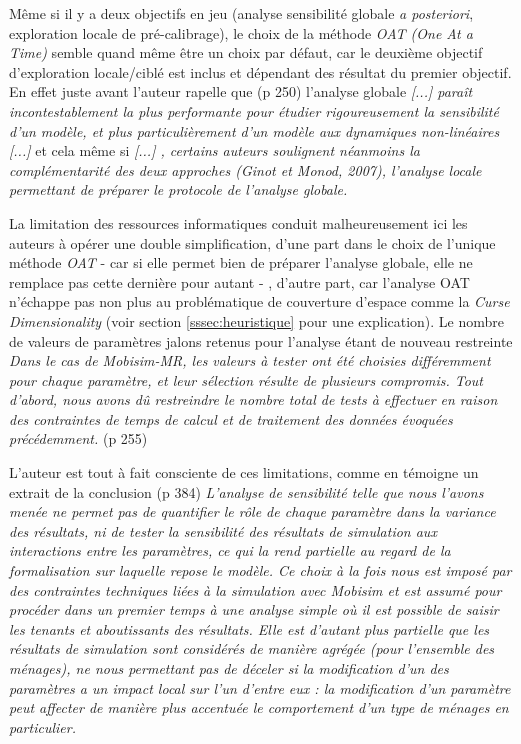 {Même si il y a deux objectifs en jeu (analyse sensibilité globale \textit{a posteriori}, exploration locale de pré-calibrage), le choix de la méthode \textit{OAT (One At a Time)} semble quand même être un choix par défaut, car le deuxième objectif d'exploration locale/ciblé est inclus et dépendant des résultat du premier objectif. En effet juste avant l'auteur rapelle que (p 250) l'analyse globale \textit{[...] paraît incontestablement la plus performante pour étudier rigoureusement la sensibilité d’un modèle, et plus particulièrement d’un modèle aux dynamiques non-linéaires [...]} et cela même si \textit{ [...] , certains auteurs soulignent néanmoins la complémentarité des deux approches (Ginot et Monod, 2007), l’analyse locale permettant de préparer le protocole de l’analyse globale.}

La limitation des ressources informatiques conduit malheureusement ici les auteurs à opérer une double simplification, d'une part dans le choix de l'unique méthode \textit{OAT} - car si elle permet bien de préparer l'analyse globale, elle ne remplace pas cette dernière pour autant - , d'autre part, car l'analyse OAT n'échappe pas non plus au problématique de couverture d'espace comme la \textit{Curse Dimensionality} (voir section \ref{sssec:heuristique} pour une explication). Le nombre de valeurs de paramètres jalons retenus pour l'analyse étant de nouveau restreinte \textit{Dans le cas de Mobisim-MR, les valeurs à tester ont été choisies différemment pour chaque paramètre, et leur sélection résulte de plusieurs compromis. Tout d’abord, nous avons dû restreindre le nombre total de tests à effectuer en raison des contraintes de temps de calcul et de traitement des données évoquées précédemment.} (p 255)

L'auteur est tout à fait consciente de ces limitations, comme en témoigne un extrait de la conclusion (p 384) \textit{L’analyse de sensibilité telle que nous l’avons menée ne permet pas de quantifier le rôle de chaque paramètre dans la variance des résultats, ni de tester la sensibilité des résultats de simulation aux interactions entre les paramètres, ce qui la rend partielle au regard de la formalisation sur laquelle repose le modèle. Ce choix à la fois nous est imposé par des contraintes techniques liées à la simulation avec Mobisim et est assumé pour procéder dans un premier temps à une analyse simple où il est possible de saisir les tenants et aboutissants des résultats. Elle est d’autant plus partielle que les résultats de simulation sont considérés de manière agrégée (pour l’ensemble des ménages), ne nous permettant pas de déceler si la modification d’un des paramètres a un impact local sur l’un d’entre eux : la modification d’un paramètre peut affecter de manière plus accentuée le comportement d’un type de ménages en particulier.}

}
